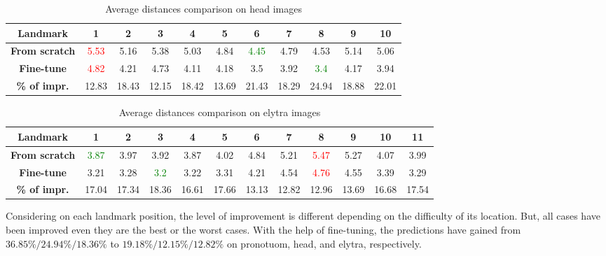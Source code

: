 \documentclass[review]{elsarticle}
\begin{document}
\begin{table}[h!]
	\centering
	\begin{tabular}{| c || c | c | c | c | c | c | c | c | c | c |}
		\hline
		\textbf{Landmark} & 1 & 2 & 3 & 4 & 5 & 6 & 7 & 8 & 9 & 10 \\ \hline \hline
		\textbf{From scratch} & \textcolor{red}{5.53} & 5.16 & 5.38 & 5.03 & 4.84 & \textcolor{green}{4.45} & 4.79 & 4.53 & 5.14 & 5.06 \\ \hline
		\textbf{Fine-tune} & \textcolor{red}{4.82} & 4.21 & 4.73 & 4.11 & 4.18 & 3.5 & 3.92 & \textcolor{green}{3.4} & 4.17 & 3.94 \\ \hline \hline
		\textbf{\% of impr.} & 12.83 & 18.43 & 12.15 & 18.42 & 13.69 & 21.43 & 18.29 & 24.94 & 18.88 & 22.01 \\ \hline
	\end{tabular}
	\caption{Average distances comparison on head images}
	\label{tblfn_head}
\end{table}

\begin{table}[h!]
	\centering
	\begin{tabular}{| c || c | c | c | c | c | c | c | c | c | c | c |}
		\hline
		\textbf{Landmark} & 1 & 2 & 3 & 4 & 5 & 6 & 7 & 8 & 9 & 10 & 11 \\ \hline \hline
		\textbf{From scratch} & \textcolor{green}{3.87} & 3.97 & 3.92 & 3.87 & 4.02 & 4.84 & 5.21 & \textcolor{red}{5.47} & 5.27 & 4.07 & 3.99 \\ \hline
		\textbf{Fine-tune} & 3.21 & 3.28 & \textcolor{green}{3.2} & 3.22 & 3.31 & 4.21 & 4.54 & \textcolor{red}{4.76} & 4.55 & 3.39 & 3.29 \\ \hline \hline
		\textbf{\% of impr.} & 17.04 & 17.34 & 18.36 & 16.61 & 17.66 & 13.13 & 12.82 & 12.96 & 13.69 & 16.68 & 17.54 \\ \hline
	\end{tabular}
	\caption{Average distances comparison on elytra images}
	\label{tblfn_elytra}
\end{table}

Considering on each landmark position, the level of improvement is different
depending on the difficulty of its location. But, all cases have been
improved even they are the best or the worst cases. With the help of
fine-tuning, the predictions have gained from $36.85\%/ 24.94\%/
18.36\%$ to $19.18\%/ 12.15\%/ 12.82\%$ on pronotuom, head, and
elytra, respectively.
\end{document}
